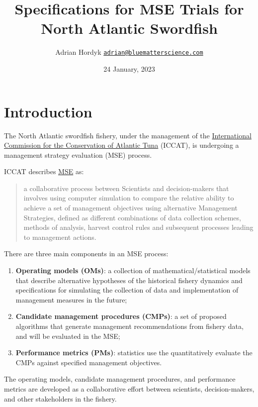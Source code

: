 \documentclass[
]{article}
\title{Specifications for MSE Trials for North Atlantic Swordfish}
\author{Adrian Hordyk \href{mailto:adrian@bluematterscience.com}{\nolinkurl{adrian@bluematterscience.com}}}
\date{24 January, 2023}
\providecommand{\tightlist}{%
  \setlength{\itemsep}{0pt}\setlength{\parskip}{0pt}}
\begin{document}
\maketitle

{
\hypersetup{linkcolor=}
\setcounter{tocdepth}{2}
\tableofcontents
}
\hypertarget{introduction}{%
\section{Introduction}\label{introduction}}

The North Atlantic swordfish fishery, under the management of the \href{https://www.iccat.int/en/index.asp}{International Commission for the Conservation of Atlantic Tuna} (ICCAT), is undergoing a management strategy evaluation (MSE) process.

ICCAT describes \href{https://www.iccat.int/mse/en/index.asp}{MSE} as:

\begin{quote}
a collaborative process between Scientists and decision-makers that involves using computer simulation to compare the relative ability to achieve a set of management objectives using alternative Management Strategies, defined as different combinations of data collection schemes, methods of analysis, harvest control rules and subsequent processes leading to management actions.
\end{quote}

There are three main components in an MSE process:

\begin{enumerate}
\def\labelenumi{\arabic{enumi}.}
\tightlist
\item
  \textbf{Operating models (OMs)}: a collection of mathematical/statistical models that describe alternative hypotheses of the historical fishery dynamics and specifications for simulating the collection of data and implementation of management measures in the future;
\item
  \textbf{Candidate management procedures (CMPs)}: a set of proposed algorithms that generate management recommendations from fishery data, and will be evaluated in the MSE;
\item
  \textbf{Performance metrics (PMs)}: statistics use the quantitatively evaluate the CMPs against specified management objectives.
\end{enumerate}

The operating models, candidate management procedures, and performance metrics are developed as a collaborative effort between scientists, decision-makers, and other stakeholders in the fishery.
\end{document}
